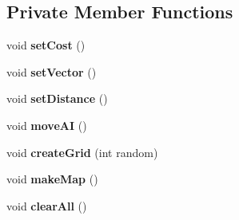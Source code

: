 \subsection*{Private Member Functions}
\begin{DoxyCompactItemize}
\item 
\mbox{\label{class_grid_ab241558dff6456fdfc66c03a09d33479}} 
void {\bfseries set\+Cost} ()
\item 
\mbox{\label{class_grid_ad4dcab53aae83978a77ad6b9cd459c3e}} 
void {\bfseries set\+Vector} ()
\item 
\mbox{\label{class_grid_a357745b9903ca9c2a9c70024ad079ed1}} 
void {\bfseries set\+Distance} ()
\item 
\mbox{\label{class_grid_aa662cb1071e1138c1c4cf1ddd592146b}} 
void {\bfseries move\+AI} ()
\item 
\mbox{\label{class_grid_af63dd2374a80c307414dae303b0d052e}} 
void {\bfseries create\+Grid} (int random)
\item 
\mbox{\label{class_grid_ae8c93e8d4957334f59ce65a542b67b98}} 
void {\bfseries make\+Map} ()
\item 
\mbox{\label{class_grid_ad87359494dcfba12f838b621869794ae}} 
void {\bfseries clear\+All} ()
\end{DoxyCompactItemize}
